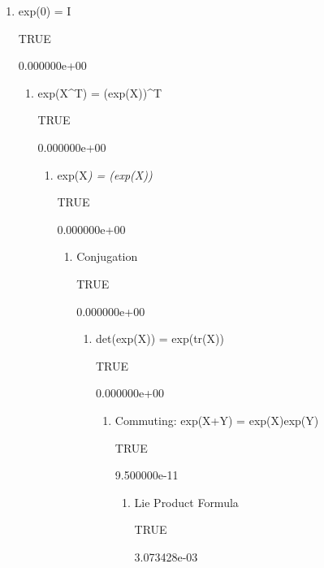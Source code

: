 \documentclass[
]{book}
\providecommand{\tightlist}{%
  \setlength{\itemsep}{0pt}\setlength{\parskip}{0pt}}
\theoremstyle{definition}
\theoremstyle{definition}
\theoremstyle{definition}
\theoremstyle{definition}
\theoremstyle{remark}
\begin{document}
\begin{enumerate}
\def\labelenumi{\arabic{enumi}.}
\tightlist
\item
  exp(0) = I

  TRUE

  0.000000e+00

  \begin{enumerate}
  \def\labelenumii{\arabic{enumii}.}
  \setcounter{enumii}{1}
  \tightlist
  \item
    exp(X\^{}T) = (exp(X))\^{}T

    TRUE

    0.000000e+00

    \begin{enumerate}
    \def\labelenumiii{\arabic{enumiii}.}
    \setcounter{enumiii}{2}
    \tightlist
    \item
      exp(X\emph{) = (exp(X))}

      TRUE

      0.000000e+00

      \begin{enumerate}
      \def\labelenumiv{\arabic{enumiv}.}
      \setcounter{enumiv}{3}
      \tightlist
      \item
        Conjugation

        TRUE

        0.000000e+00

        \begin{enumerate}
        \def\labelenumv{\arabic{enumv}.}
        \tightlist
        \item
          det(exp(X)) = exp(tr(X))

          TRUE

          0.000000e+00

          \begin{enumerate}
          \def\labelenumvi{\arabic{enumvi}.}
          \tightlist
          \item
            Commuting: exp(X+Y) = exp(X)exp(Y)

            TRUE

            9.500000e-11

            \begin{enumerate}
            \def\labelenumvii{\arabic{enumvii}.}
            \tightlist
            \item
              Lie Product Formula

              TRUE

              3.073428e-03
            \end{enumerate}
          \end{enumerate}
        \end{enumerate}
      \end{enumerate}
    \end{enumerate}
  \end{enumerate}
\end{enumerate}
\end{document}
